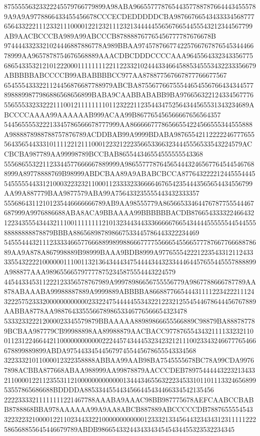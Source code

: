 87555556323322245579766779899A98ABA966557778765443577887876644434555789A9A9A9778866433455456678CCCECDEDDDDDCBA9876676654343333456877765643322211123321110000122123211123213444445565676654455543212344567799AB9AACBCCCBA989A99ABCCCB878888767765456777787676678B
9744443323321024446887886778A989BBAA97457876677422576676787654534446678999AA9657878754676568889AAACDBCDDDCCCCAAA9645564332343356775686543353212101222000111111112211223321024443346645885345553432233356679ABBBBBABCCCCB99ABABBBBCC977AA878877567667877766677567
6545554333221124456876687788979ABCBA8755677667555446545567664343445778988899877986886568656899BABA9CAABBABABB9BA9766563221243345677765565553323322211100121111111101123222112354434752564344565531343234689ABCCCCAAAA99AAAAAAB999ACAA99B867765456566667656564357
544565555322213345786566678777999AA86666677786566554224566555344555888A9888878988788757876789ACDDBAB99A9999BDABA9876554211222224677765556435654433310111122121110001223212223566533663234445556533543224579ACCBCBA987789AA99998789BCCBAB865544346554555555543368
555686553221123344577666667889999A98655777876456544432465677645445467688999A89778888769B98999ABDCBAA89A9ABABCBCCA87764322221244555444554555554433121000322323211000112333323366664676542354443565654434556799AA99A887779BAA9877579ABA99A756433235555443432333357
55568643112101235446666666789AB9AA98555779A86566533464476787755544467687999A9976886688ABA8ACA9BBAAAA99BBBBBBACDB87665433332246643212234355543443211100111111112101323443443336666676654344445555554454455588888888878879BBBA886568987898667533445786443322234469
54555444321112333346657766688998998866677775566654556657778766776668878689AA9A878A867998889B98999BAAA9BDB8999A977655542221223543312112433335543222210000001110011321364344434754444344323344464457655445557888899A988877AAA9896556657977778752345875554443224579
445443345311222123356578767989A99978986656755556779A9867788666787789AA878ABAAABA99988887889A9999889ABBBBA866887766544431111223422211124322257523332000000000000233224754444455343221223212554544678644456767889AABBA8778AA98876433555667898653346776566654323478
533323322212000023345579879BBAAAAA88989866655566889C98879BA888787789BCBAA987779CB99988898AA89988879AACBACC9778765543432111133232110011231224664421100000000000022244574344453234232121110023343246677765466678899889899ABDA9754433454456797455445678655543334568
32233321011000012322358888ABBAA99AAB98BA7545555678BC78A99CDA99767898ACBBA877668ABAA988999AA99878879AACCCDEB7897544444322321343321100001221123553112100000000000001344434655632223453310110111332465689953557865686688BDDDDA8853344554434566445434466334542135456
22223333211111111221467788AAABA9AAAC98BB987775678AEFCAABCCBABB8788868BBA978AAAAAA99A9AA8ABCB887889ABCCCCCDB7887655554543322322321000012211023443322100000000000012333213345644323434312311111222586568855645446679789ABDB986654332443433434545434455323532234345
